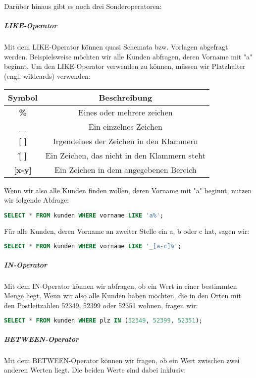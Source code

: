 \documentclass{article}
\begin{document}
	Darüber hinaus gibt es noch drei Sonderoperatoren:

	\subparagraph{LIKE-Operator}
	Mit dem LIKE-Operator können quasi Schemata bzw. Vorlagen abgefragt werden. Beispielsweise möchten wir alle Kunden abfragen, deren Vorname mit "a" beginnt.
	Um den LIKE-Operator verwenden zu können, müssen wir Platzhalter (engl. wildcards) verwenden:
	
	\begin{center}
		\def\arraystretch{1.1}
		\begin{tabular}{ | c | c |}
			\hline
			\textbf{Symbol} 	& \textbf{Beschreibung} \\
			\hline
			\hline
			\textbf{\%} 		& Eines oder mehrere zeichen \\
			\textbf{\_} 		& Ein einzelnes Zeichen \\
			\textbf{[ ]} 		& Irgendeines der Zeichen in den Klammern \\
			\textbf{\^ [  ]} 	& Ein Zeichen, das nicht in den Klammern steht \\
			\textbf{[x-y]} 		& Ein Zeichen in dem angegebenen Bereich \\
			\hline
		\end{tabular}
	\end{center}

	Wenn wir also alle Kunden finden wollen, deren Vorname mit "a" beginnt, nutzen wir folgende Abfrage:

	\begin{lstlisting}[language=SQL]
	SELECT * FROM kunden WHERE vorname LIKE 'a%';
	\end{lstlisting}

	Für alle Kunden, deren Vorname an zweiter Stelle ein a, b oder c hat, sagen wir:

	\begin{lstlisting}[language=SQL]
	SELECT * FROM kunden WHERE vorname LIKE '_[a-c]%';
	\end{lstlisting}

	\subparagraph{IN-Operator}
	Mit dem IN-Operator können wir abfragen, ob ein Wert in einer bestimmten Menge liegt. Wenn wir also alle Kunden haben möchten, die in den Orten mit den Postleitzahlen 52349, 52399 oder 52351 wohnen, fragen wir:

	\begin{lstlisting}[language=SQL]
	SELECT * FROM kunden WHERE plz IN (52349, 52399, 52351);
	\end{lstlisting}

	\subparagraph{BETWEEN-Operator}
	Mit dem BETWEEN-Operator können wir fragen, ob ein Wert zwischen zwei anderen Werten liegt. Die beiden Werte sind dabei inklusiv:
\end{document}
